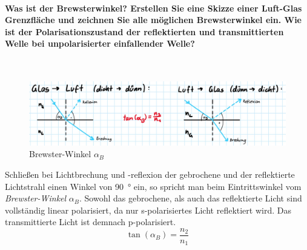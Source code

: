 \documentclass[a4paper, 11pt, ngerman, parskip=half-]{scrartcl}
\newcommand{\myparagraph}[1]{\paragraph{#1}\mbox{}\\}
\begin{document}
\myparagraph{Was ist der Brewsterwinkel? Erstellen Sie eine Skizze einer Luft-Glas Grenzfläche und zeichnen Sie alle möglichen Brewsterwinkel ein. Wie ist der Polarisationszustand der reflektierten und transmittierten Welle bei unpolarisierter einfallender Welle?}
%
\begin{figure}[H]
    \centering
    \begin{samepage}
        \includegraphics[width=\textwidth]{image/15/brewster.jpg}
        \caption{Brewster-Winkel $\alpha_B$}
        \label{fig:brewster-winkel}
    \end{samepage}
\end{figure}
%
Schließen bei Lichtbrechung und -reflexion der gebrochene und der reflektierte Lichtstrahl einen Winkel von \SI{90}{\degree} ein, so spricht man beim Eintrittswinkel vom \textit{Brewster-Winkel} $\alpha_B$. Sowohl das gebrochene, als auch das reflektierte Licht sind vollständig linear polarisiert, da nur s-polarisiertes Licht reflektiert wird. Das transmittierte Licht ist demnach p-polarisiert.
%
\begin{equation}
    \label{eq:brewster-winkel}
    \tan(\alpha_B) = \frac{n_2}{n_1}
\end{equation}
\end{document}

